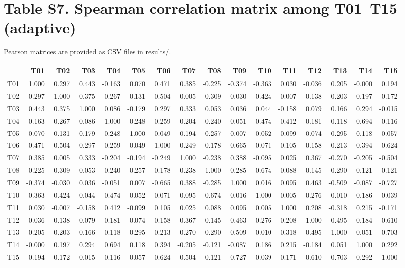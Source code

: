 \documentclass[10pt]{article}
\begin{document}
\section*{Table S7. Spearman correlation matrix among T01--T15 (adaptive)}
Pearson matrices are provided as CSV files in results/.

{\scriptsize\setlength{\tabcolsep}{3pt}\begin{longtable}{lrrrrrrrrrrrrrrr}
\toprule
 & T01 & T02 & T03 & T04 & T05 & T06 & T07 & T08 & T09 & T10 & T11 & T12 & T13 & T14 & T15 \\
\midrule
\endhead
T01 & 1.000 & 0.297 & 0.443 & -0.163 & 0.070 & 0.471 & 0.385 & -0.225 & -0.374 & -0.363 & 0.030 & -0.036 & 0.205 & -0.000 & 0.194 \\
T02 & 0.297 & 1.000 & 0.375 & 0.267 & 0.131 & 0.504 & 0.005 & 0.309 & -0.030 & 0.424 & -0.007 & 0.138 & -0.203 & 0.197 & -0.172 \\
T03 & 0.443 & 0.375 & 1.000 & 0.086 & -0.179 & 0.297 & 0.333 & 0.053 & 0.036 & 0.044 & -0.158 & 0.079 & 0.166 & 0.294 & -0.015 \\
T04 & -0.163 & 0.267 & 0.086 & 1.000 & 0.248 & 0.259 & -0.204 & 0.240 & -0.051 & 0.474 & 0.412 & -0.181 & -0.118 & 0.694 & 0.116 \\
T05 & 0.070 & 0.131 & -0.179 & 0.248 & 1.000 & 0.049 & -0.194 & -0.257 & 0.007 & 0.052 & -0.099 & -0.074 & -0.295 & 0.118 & 0.057 \\
T06 & 0.471 & 0.504 & 0.297 & 0.259 & 0.049 & 1.000 & -0.249 & 0.178 & -0.665 & -0.071 & 0.105 & -0.158 & 0.213 & 0.394 & 0.624 \\
T07 & 0.385 & 0.005 & 0.333 & -0.204 & -0.194 & -0.249 & 1.000 & -0.238 & 0.388 & -0.095 & 0.025 & 0.367 & -0.270 & -0.205 & -0.504 \\
T08 & -0.225 & 0.309 & 0.053 & 0.240 & -0.257 & 0.178 & -0.238 & 1.000 & -0.285 & 0.674 & 0.088 & -0.145 & 0.290 & -0.121 & 0.121 \\
T09 & -0.374 & -0.030 & 0.036 & -0.051 & 0.007 & -0.665 & 0.388 & -0.285 & 1.000 & 0.016 & 0.095 & 0.463 & -0.509 & -0.087 & -0.727 \\
T10 & -0.363 & 0.424 & 0.044 & 0.474 & 0.052 & -0.071 & -0.095 & 0.674 & 0.016 & 1.000 & 0.005 & -0.276 & 0.010 & 0.186 & -0.039 \\
T11 & 0.030 & -0.007 & -0.158 & 0.412 & -0.099 & 0.105 & 0.025 & 0.088 & 0.095 & 0.005 & 1.000 & 0.208 & -0.318 & 0.215 & -0.171 \\
T12 & -0.036 & 0.138 & 0.079 & -0.181 & -0.074 & -0.158 & 0.367 & -0.145 & 0.463 & -0.276 & 0.208 & 1.000 & -0.495 & -0.184 & -0.610 \\
T13 & 0.205 & -0.203 & 0.166 & -0.118 & -0.295 & 0.213 & -0.270 & 0.290 & -0.509 & 0.010 & -0.318 & -0.495 & 1.000 & 0.051 & 0.703 \\
T14 & -0.000 & 0.197 & 0.294 & 0.694 & 0.118 & 0.394 & -0.205 & -0.121 & -0.087 & 0.186 & 0.215 & -0.184 & 0.051 & 1.000 & 0.292 \\
T15 & 0.194 & -0.172 & -0.015 & 0.116 & 0.057 & 0.624 & -0.504 & 0.121 & -0.727 & -0.039 & -0.171 & -0.610 & 0.703 & 0.292 & 1.000 \\
\bottomrule
\end{longtable}}
\end{document}
